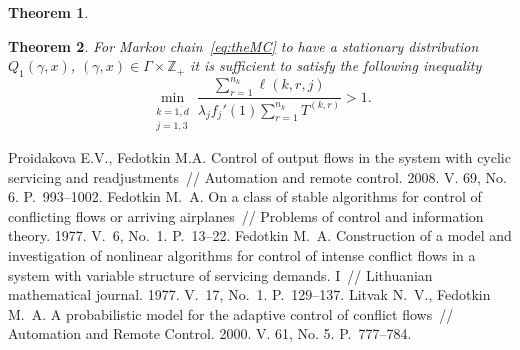 \documentclass[60x84/16,10pt]{dccn}
\newtheorem{theorem}{Theorem}[section]
\begin{document}
{\begin{theorem}
\label{theorem:gen}
\end{theorem}



\begin{theorem}\sloppy
For Markov chain~\eqref{eq:theMC} to have a stationary distribution $Q_1(\gamma,x)$, $(\gamma,x)\in \Gamma \times {\mathbb Z}_+$ it is sufficient to satisfy the following inequality 
\begin{equation}
\min_{\substack{k=\overline{1,d}\\ j=1,3}} { \frac{\sum_{r = 1}^{n_k} \ell(k,r,j) }{\lambda_j f_j'(1) \sum_{r=1}^{n_k} T^{(k,r)} }}>1.
\label{sufficient:double}
\end{equation}
\end{theorem}

\begin{thebibliography}{11}
%
  Proidakova E.V., Fedotkin M.A. Control of output flows in the system with cyclic servicing and
  readjustments~// Automation and remote control. 2008. V. 69, No. 6. P.~993--1002.
  Fedotkin M.~A. On a class of stable algorithms for control of conflicting flows or arriving
  airplanes~// Problems of control and information theory. 1977. V.~6, No.~1. P.~13--22.
  Fedotkin M.~A. Construction of a model and investigation of nonlinear algorithms for control of
  intense conflict flows in a system with variable structure of servicing demands. I~// Lithuanian
  mathematical journal. 1977. V.~17, No.~1. P.~129--137.
%
  Litvak N.~V., Fedotkin M.~A. A probabilistic model for the
  adaptive control of conflict flows~// Automation and Remote Control. 2000. V. 61, No. 5. P.~777--784.


\end{thebibliography}}
\end{document}
